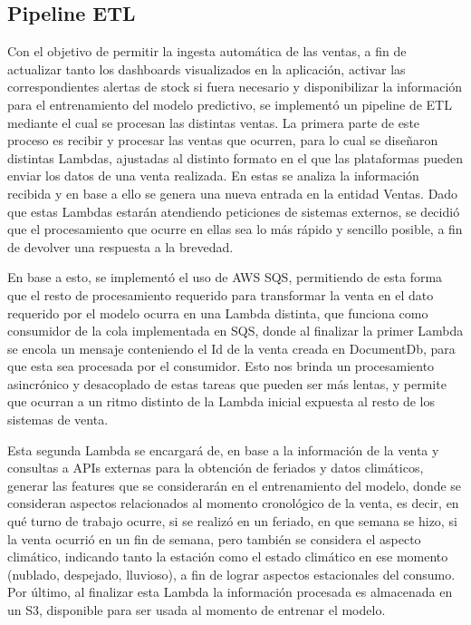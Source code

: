 \subsection{Pipeline ETL}\label{sec:pipeline-etl}

Con el objetivo de permitir la ingesta automática de las ventas, a fin de actualizar tanto los dashboards visualizados en la aplicación, activar las correspondientes alertas de stock si fuera necesario y disponibilizar la información para el entrenamiento del modelo predictivo, se implementó un pipeline de ETL mediante el cual se procesan las distintas ventas. La primera parte de este proceso es recibir y procesar las ventas que ocurren, para lo cual se diseñaron distintas Lambdas, ajustadas al distinto formato en el que las plataformas pueden enviar los datos de una venta realizada. En estas se analiza la información recibida y en base a ello se genera una nueva entrada en la entidad Ventas. Dado que estas Lambdas estarán atendiendo peticiones de sistemas externos, se decidió que el procesamiento que ocurre en ellas sea lo más rápido y sencillo posible, a fin de devolver una respuesta a la brevedad.

En base a esto, se implementó el uso de AWS SQS, permitiendo de esta forma que el resto de procesamiento requerido para transformar la venta en el dato requerido por el modelo ocurra en una Lambda distinta, que funciona como consumidor de la cola implementada en SQS, donde al finalizar la primer Lambda se encola un mensaje conteniendo el Id de la venta creada en DocumentDb, para que esta sea procesada por el consumidor. Esto nos brinda un procesamiento asincrónico y desacoplado de estas tareas que pueden ser más lentas, y permite que ocurran a un ritmo distinto de la Lambda inicial expuesta al resto de los sistemas de venta.

Esta segunda Lambda se encargará de, en base a la información de la venta y consultas a APIs externas para la obtención de feriados y datos climáticos, generar las features que se considerarán en el entrenamiento del modelo, donde se consideran aspectos relacionados al momento cronológico de la venta, es decir, en qué turno de trabajo ocurre, si se realizó en un feriado, en que semana se hizo, si la venta ocurrió en un fin de semana, pero también se considera el aspecto climático, indicando tanto la estación como el estado climático en ese momento (nublado, despejado, lluvioso), a fin de lograr aspectos estacionales del consumo.
Por último, al finalizar esta Lambda la información procesada es almacenada en un S3, disponible para ser usada al momento de entrenar el modelo.


